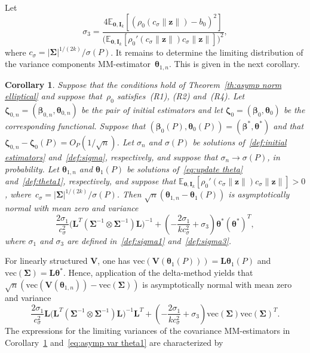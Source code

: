 \documentclass{article}
\numberwithin{equation}{section}
\theoremstyle{plain}
\newtheorem{corollary}{Corollary}
\newcommand{\vc}{\mathrm{vec}}
\newcommand{\bbeta}{\bm\beta}
\newcommand{\btheta}{\bm\theta}
\newcommand{\bSigma}{\mathbf{\Sigma}}
\newcommand{\bzeta}{\bm\zeta}
\newcommand{\bz}{\mathbf{z}}
\newcommand{\bV}{\mathbf{V}}
\newcommand{\bI}{\mathbf{I}}
\newcommand{\bL}{\mathbf{L}}
\newcommand{\E}{\mathbb{E}}
\begin{document}
Let
\begin{equation}
\label{def:sigma3}
\sigma_3=
\frac{4\E_{\mathbf{0},\bI_k}
\left[
\left(\rho_0(c_\sigma\|\bz\|)-b_0\right)^2
\right]}{
\big(\E_{\mathbf{0},\bI_k}
\left[
\rho_0'(c_\sigma\|\bz\|)c_\sigma\|\bz\|
\right]
\big)^2},
\end{equation}
where $c_\sigma=|\bSigma|^{1/(2k)}/\sigma(P)$.
It remains to determine the limiting distribution of the variance components MM-estimator~$\btheta_{1,n}$.
This is given in the next corollary.
\begin{corollary}
\label{cor:asymp norm theta1}
Suppose that the conditions hold of Theorem~\ref{th:asymp norm elliptical}
and suppose that~$\rho_0$ satisfies~(R1), (R2) and~(R4).
Let $\bzeta_{0,n}=(\bbeta_{0,n},\btheta_{0,n})$ be the pair of initial estimators
and let $\bzeta_0=(\bbeta_0,\btheta_0)$ be the corresponding functional.
Suppose that $(\bbeta_0(P),\btheta_0(P))=(\bbeta^*,\btheta^*)$ and that $\bzeta_{0,n}-\bzeta_0(P)=O_P(1/\sqrt{n})$.
Let $\sigma_n$ and $\sigma(P)$ be solutions of~\eqref{def:initial estimators} and~\eqref{def:sigma}, respectively,
and suppose that $\sigma_n\to\sigma(P)$, in probability.
Let $\btheta_{1,n}$ and $\btheta_1(P)$ be solutions of~\eqref{eq:update theta} and~\eqref{def:theta1}, respectively,
and suppose that $\E_{\mathbf{0},\bI_k}[\rho_0'(c_\sigma\|\bz\|)c_\sigma\|\bz\|]>0$,
where~$c_\sigma=|\bSigma|^{1/(2k)}/\sigma(P)$.
Then $\sqrt{n}(\btheta_{1,n}-\btheta_1(P))$ is asymptotically normal with mean zero and variance
\[
\frac{2\sigma_1}{c_\sigma^2}
\Big(\bL^T\left(\bSigma^{-1}\otimes\bSigma^{-1}\right)\bL\Big)^{-1}
+
\left(
-\frac{2\sigma_1}{kc_\sigma^2}
+
\sigma_3
\right)
\btheta^*(\btheta^*)^T,
\]
where $\sigma_1$ and $\sigma_3$ are defined in~\eqref{def:sigma1} and~\eqref{def:sigma3}.
\end{corollary}
For linearly structured $\bV$, one has $\vc(\bV(\btheta_1(P)))=\bL\btheta_1(P)$ and $\vc(\bSigma)=\bL\btheta^*$.
Hence, application of the delta-method yields that
$\sqrt{n}(\vc(\bV(\btheta_{1,n}))-\vc(\bSigma))$ is asymptotically normal with 
mean zero and variance
\begin{equation}
\label{eq:asymp var theta1}
\frac{2\sigma_1}{c_\sigma^2}
\bL\Big(\bL^T\left(\bSigma^{-1}\otimes\bSigma^{-1}\right)\bL\Big)^{-1}\bL^T
+
\left(
-\frac{2\sigma_1}{kc_\sigma^2}
+
\sigma_3
\right)
\vc(\bSigma)
\vc(\bSigma)^T.
\end{equation}
The expressions for the limiting variances of the covariance
MM-estimators in Corollary~\ref{cor:asymp norm theta1} and~\eqref{eq:asymp var theta1} are characterized by
\end{document}
